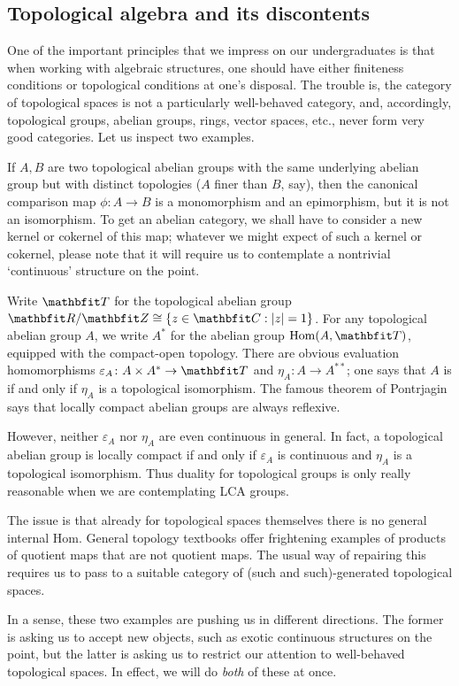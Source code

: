 \subsection*{Topological algebra and its discontents}

One of the important principles that we impress on our undergraduates is that when working with algebraic structures, one should have either finiteness conditions or topological conditions at one's disposal.
The trouble is, the category of topological spaces is not a particularly well-behaved category, and, accordingly, topological groups, abelian groups, rings, vector spaces, etc., never form very good categories.
Let us inspect two examples.

\begin{exm*}
	If $ A, B $ are two topological abelian groups with the same underlying abelian group but with distinct topologies ($ A $ finer than $ B $, say), then the canonical comparison map $ \phi \colon A \to B $ is a monomorphism and an epimorphism, but it is not an isomorphism.
	To get an abelian category, we shall have to consider a new kernel or cokernel of this map;
	whatever we might expect of such a kernel or cokernel, please note that it will require us to contemplate a nontrivial `continuous' structure on the point.
\end{exm*}

\begin{exm*}
	Write $ \TT $ for the topological abelian group $ \RR/\ZZ \cong \{ z \in \CC : |z| = 1 \} $.
	For any topological abelian group $ A $, we write $ A^{\ast} $ for the  abelian group $ \Hom(A, \TT) $, equipped with the compact-open topology.
	There are obvious evaluation homomorphisms $ \varepsilon_A \colon A \times A^{\ast} \to \TT $ and $ \eta_A \colon A \to A^{\ast\ast} $;
	one says that $ A $ is  if and only if $ \eta_A $ is a topological isomorphism.
	The famous theorem of Pontrjagin says that locally compact abelian groups are always reflexive.

	However, neither $ \varepsilon_A $ nor $ \eta_A $ are even continuous in general.
	In fact, a topological abelian group is locally compact if and only if $ \varepsilon_A $ is continuous and $ \eta_A $ is a topological isomorphism.
	Thus duality for topological groups is only really reasonable when we are contemplating LCA groups.

	The issue is that already for topological spaces themselves there is no general internal Hom.
	General topology textbooks offer frightening examples of products of quotient maps that are not quotient maps.
	The usual way of repairing this requires us to pass to a suitable category of (such and such)-generated topological spaces.
\end{exm*}

In a sense, these two examples are pushing us in different directions.
The former is asking us to accept new objects, such as exotic continuous structures on the point,
but the latter is asking us to restrict our attention to well-behaved topological spaces.
In effect, we will do \emph{both} of these at once.


